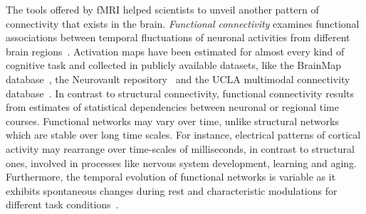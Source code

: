The tools offered by fMRI helped scientists to unveil another pattern of connectivity that exists in the brain.
\emph{Functional connectivity} examines functional associations between temporal fluctuations of neuronal activities from different brain regions~\cite{biswal1995}.
Activation maps have been estimated for almost every kind of cognitive task and collected in publicly available datasets, like the BrainMap database~\cite{fox2002}, the Neurovault repository~\cite{gorgolewski2015} and the UCLA multimodal connectivity database~\cite{brown2012}.
In contrast to structural connectivity, functional connectivity results from estimates of statistical dependencies between neuronal or regional time courses.
Functional networks may vary over time, unlike structural networks which are stable over long time scales.
For instance, electrical patterns of cortical activity may rearrange over time-scales of milliseconds, in contrast to structural ones, involved in processes like nervous system development, learning and aging.
Furthermore, the temporal evolution of functional networks is variable as it exhibits spontaneous changes during rest and characteristic modulations for different task conditions~\cite{honey2007,hutchison2013}.

